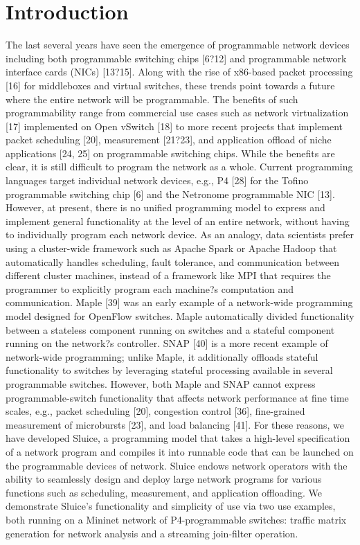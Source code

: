 \section{Introduction}
The last several years have seen the emergence of programmable network devices including both programmable switching chips [6?12] and programmable network interface cards (NICs) [13?15]. Along with the rise of x86-based packet processing [16] for middleboxes and virtual switches, these trends point towards a future where the entire network will be programmable. The benefits of such programmability range from commercial use cases such as network virtualization [17] implemented on Open vSwitch [18] to more recent projects that implement packet scheduling [20], measurement [21?23], and application offload of niche applications [24, 25] on programmable switching chips. While the benefits are clear, it is still difficult to program the network as a whole. Current programming languages target individual network devices, e.g., P4 [28] for the Tofino programmable switching chip [6] and the Netronome programmable NIC [13]. However, at present, there is no unified programming model to express and implement general functionality at the level of an entire network, without having to individually program each network device. As an analogy, data scientists prefer using a cluster-wide framework such as Apache Spark or Apache Hadoop that automatically handles scheduling, fault tolerance, and communication between different cluster machines, instead of a framework like MPI that requires the programmer to explicitly program each machine?s computation and communication.
    Maple [39] was an early example of a network-wide programming model designed for OpenFlow switches. Maple automatically divided functionality between a stateless component running on switches and a stateful component running on the network?s controller. SNAP [40] is a more recent example of network-wide programming; unlike Maple, it additionally offloads stateful functionality to switches by leveraging stateful processing available in several programmable switches. However, both Maple and SNAP cannot express programmable-switch functionality that affects network performance at fine time scales, e.g., packet scheduling [20], congestion control [36], fine-grained measurement of microbursts [23], and load balancing [41]. For these reasons, we have developed Sluice, a programming model that takes a high-level specification of a network program and compiles it into runnable code that can be launched on the programmable devices of network. Sluice endows network operators with the ability to seamlessly design and deploy large network programs for various functions such as scheduling, measurement, and application offloading. We demonstrate Sluice's functionality and simplicity of use via two use examples, both running on a Mininet network of P4-programmable switches: traffic matrix generation for network analysis and a streaming join-filter operation.
